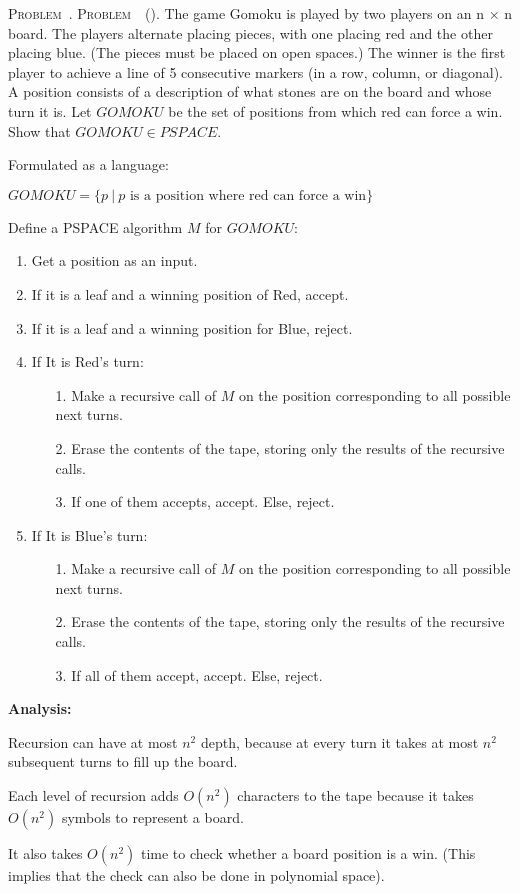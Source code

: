 \documentclass[12pt]{article}
\newcounter{problem}
\newenvironment{prob}[1][]
{
\refstepcounter{problem}\par\medskip
\def\myArg{#1}
 \ifx\myArg\empty
 \noindent \textsc{Problem~\theproblem.} \rmfamily
 \else
 \noindent \textsc{Problem~\theproblem\ (\textnormal{#1}).} \rmfamily
 \fi
}
{
\medskip

}
\begin{document}
\begin{prob} The game Gomoku is played by two players on an n × n board. The players alternate placing pieces, with one placing red and the other placing blue. (The pieces must be placed on open spaces.) The winner is the first player to achieve a line of 5 consecutive markers (in a row, column, or diagonal). A position consists of a description of what stones are on the board and whose turn it is. Let $GOMOKU$ be the set of positions from which red can force a win. Show that $GOMOKU \in PSPACE$.

Formulated as a language:

$GOMOKU = \{ p\ | \ p \text{ is a position where red can force a win} \}$

Define a PSPACE algorithm $M$ for $GOMOKU$:

\begin{enumerate}

    \item Get a position as an input.
    \item If it is a leaf and a winning position of Red, accept.
    \item If it is a leaf and a winning position for Blue, reject.
    \item If It is Red's turn:
    \begin{enumerate}
        \item[1.] Make a recursive call of $M$ on the position corresponding to all possible next turns.
        \item[2.] Erase the contents of the tape, storing only the results of the recursive calls.
        \item[3.] If one of them accepts, accept. Else, reject.
    \end{enumerate}
    \item If It is Blue's turn:
    \begin{enumerate}
        \item[1.] Make a recursive call of $M$ on the position corresponding to all possible next turns.
        \item[2.] Erase the contents of the tape, storing only the results of the recursive calls.
        \item[3.] If all of them accept, accept. Else, reject.
    \end{enumerate}


\end{enumerate}

\textbf{Analysis:}

Recursion can have at most $n^2$ depth, because at every turn it takes at most $n^2$ subsequent turns to fill up the board.

Each level of recursion adds $O(n^2)$ characters to the tape because it takes $O(n^2)$ symbols to represent a board.

It also takes $O(n^2)$ time to check whether a board position is a win. (This implies that the check can also be done in polynomial space).



\end{prob}
\end{document}
